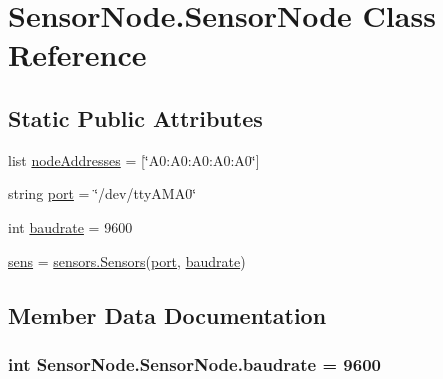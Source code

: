 \hypertarget{classSensorNode_1_1SensorNode}{}\section{Sensor\+Node.\+Sensor\+Node Class Reference}
\label{classSensorNode_1_1SensorNode}
\subsection*{Static Public Attributes}
\begin{DoxyCompactItemize}
\item 
list \hyperlink{classSensorNode_1_1SensorNode_a17be4a277b9bfdd041ec006b462d497c}{node\+Addresses} = \mbox{[}\char`\"{}A0\+:\+A0\+:\+A0\+:\+A0\+:\+A0\char`\"{}\mbox{]}
\item 
string \hyperlink{classSensorNode_1_1SensorNode_a94712cd1b0bf09fa4cd3de94ca666575}{port} = \char`\"{}/dev/tty\+A\+M\+A0\char`\"{}
\item 
int \hyperlink{classSensorNode_1_1SensorNode_a68f7a87f1d03a2734f3f6505f801a92e}{baudrate} = 9600
\item 
\hyperlink{classSensorNode_1_1SensorNode_ad8aec254c15c97a8b5c709480f31b2bb}{sens} = \hyperlink{classsensors_1_1Sensors}{sensors.\+Sensors}(\hyperlink{classSensorNode_1_1SensorNode_a94712cd1b0bf09fa4cd3de94ca666575}{port}, \hyperlink{classSensorNode_1_1SensorNode_a68f7a87f1d03a2734f3f6505f801a92e}{baudrate})
\end{DoxyCompactItemize}


\subsection{Member Data Documentation}
\subsubsection[{\texorpdfstring{baudrate}{baudrate}}]{\setlength{\rightskip}{0pt plus 5cm}int Sensor\+Node.\+Sensor\+Node.\+baudrate = 9600\hspace{0.3cm}{\ttfamily [static]}}\hypertarget{classSensorNode_1_1SensorNode_a68f7a87f1d03a2734f3f6505f801a92e}{}\label{classSensorNode_1_1SensorNode_a68f7a87f1d03a2734f3f6505f801a92e}
